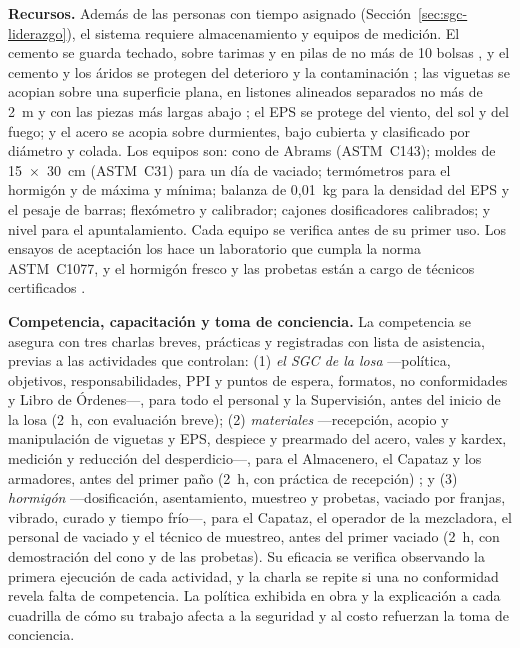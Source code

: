\textbf{Recursos.} Además de las personas con tiempo asignado (Sección~\ref{sec:sgc-liderazgo}), el sistema requiere almacenamiento y equipos de medición. El cemento se guarda techado, sobre tarimas y en pilas de no más de 10 bolsas \parencite[p.~1]{uatf_et}, y el cemento y los áridos se protegen del deterioro y la contaminación \parencite[sección 26.5.1.1, p.~578]{aci318_2025}; las viguetas se acopian sobre una superficie plana, en listones alineados separados no más de 2~m y con las piezas más largas abajo \parencite[pp.~122--123]{alcon2009}; el EPS se protege del viento, del sol y del fuego; y el acero se acopia sobre durmientes, bajo cubierta y clasificado por diámetro y colada. Los equipos son: cono de Abrams (ASTM~C143); moldes de 15~$\times$~30~cm (ASTM~C31) para un día de vaciado; termómetros para el hormigón y de máxima y mínima; balanza de 0,01~kg para la densidad del EPS y el pesaje de barras; flexómetro y calibrador; cajones dosificadores calibrados; y nivel para el apuntalamiento. Cada equipo se verifica antes de su primer uso. Los ensayos de aceptación los hace un laboratorio que cumpla la norma ASTM~C1077, y el hormigón fresco y las probetas están a cargo de técnicos certificados \parencite[sección 26.12.1.1, pp.~601--602]{aci318_2025}.

\textbf{Competencia, capacitación y toma de conciencia.} La competencia se asegura con tres charlas breves, prácticas y registradas con lista de asistencia, previas a las actividades que controlan: (1) \emph{el SGC de la losa} ---política, objetivos, responsabilidades, PPI y puntos de espera, formatos, no conformidades y Libro de Órdenes---, para todo el personal y la Supervisión, antes del inicio de la losa (2~h, con evaluación breve); (2) \emph{materiales} ---recepción, acopio y manipulación de viguetas y EPS, despiece y prearmado del acero, vales y kardex, medición y reducción del desperdicio---, para el Almacenero, el Capataz y los armadores, antes del primer paño (2~h, con práctica de recepción) \parencite[pp.~122--138]{alcon2009}; y (3) \emph{hormigón} ---dosificación, asentamiento, muestreo y probetas, vaciado por franjas, vibrado, curado y tiempo frío---, para el Capataz, el operador de la mezcladora, el personal de vaciado y el técnico de muestreo, antes del primer vaciado (2~h, con demostración del cono y de las probetas). Su eficacia se verifica observando la primera ejecución de cada actividad, y la charla se repite si una no conformidad revela falta de competencia. La política exhibida en obra y la explicación a cada cuadrilla de cómo su trabajo afecta a la seguridad y al costo refuerzan la toma de conciencia.

